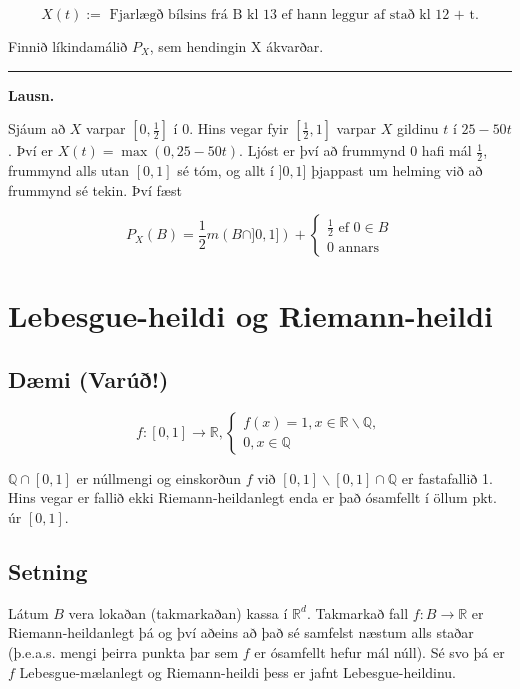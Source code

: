 \documentclass[]{book}
\begin{document}
\[
X(t) := \text{ Fjarlægð bílsins frá B kl 13 ef hann leggur af stað kl 12 + t}.
\]

Finnið líkindamálið \(P_X\), sem hendingin X ákvarðar.

\begin{center}\rule{0.5\linewidth}{\linethickness}\end{center}

\textbf{Lausn.}

Sjáum að \(X\) varpar \([0,\frac12]\) í \(0\). Hins vegar fyir \([\frac12,1]\) varpar \(X\) gildinu \(t\) í \(25 - 50t\). Því er \(X(t) = \max(0, 25 - 50t)\). Ljóst er því að frummynd 0 hafi mál \(\frac12\), frummynd alls utan \([0,1]\) sé tóm, og allt í \(]0,1]\) þjappast um helming við að frummynd sé tekin. Því fæst

\[
P_X(B) = \frac12 m(B\cap]0,1]) + 
\begin{cases}
\frac12 \text{ ef } 0 \in B \\
0 \text{ annars}
\end{cases}
\]

\hypertarget{lebesgue-heildi-og-riemann-heildi}{%
\chapter{Lebesgue-heildi og Riemann-heildi}\label{lebesgue-heildi-og-riemann-heildi}}

\hypertarget{dmi-varu}{%
\section{Dæmi (Varúð!)}\label{dmi-varu}}

\[
f:[0, 1] \rightarrow \mathbb R, 
\begin{cases} 
f(x) = 1, x\in\mathbb R\backslash\mathbb Q, \\ 
0, x\in\mathbb Q
\end{cases}
\]

\(\mathbb Q\cap[0,1]\) er núllmengi og einskorðun \(f\) við \([0,1]\backslash[0,1]\cap\mathbb Q\) er fastafallið 1. Hins vegar er fallið ekki Riemann-heildanlegt enda er það ósamfellt í öllum pkt. úr \([0,1]\).

\hypertarget{setning-54}{%
\section{Setning}\label{setning-54}}

Látum \(B\) vera lokaðan (takmarkaðan) kassa í \(\mathbb R^d\). Takmarkað fall \(f:B\rightarrow\mathbb R\) er Riemann-heildanlegt þá og því aðeins að það sé samfelst næstum alls staðar (þ.e.a.s. mengi þeirra punkta þar sem \(f\) er ósamfellt hefur mál núll). Sé svo þá er \(f\) Lebesgue-mælanlegt og Riemann-heildi þess er jafnt Lebesgue-heildinu.
\end{document}
